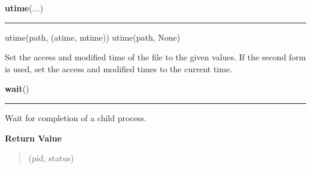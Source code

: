     \label{os:utime}

    \vspace{0.5ex}

\hspace{.8\funcindent}\begin{boxedminipage}{\funcwidth}

    \raggedright \textbf{utime}(\textit{...})

    \vspace{-1.5ex}

    \rule{\textwidth}{0.5\fboxrule}
\setlength{\parskip}{2ex}
    utime(path, (atime, mtime)) utime(path, None)

    Set the access and modified time of the file to the given values.  If 
    the second form is used, set the access and modified times to the 
    current time.

\setlength{\parskip}{1ex}
    \end{boxedminipage}

    \label{os:wait}

    \vspace{0.5ex}

\hspace{.8\funcindent}\begin{boxedminipage}{\funcwidth}

    \raggedright \textbf{wait}()

    \vspace{-1.5ex}

    \rule{\textwidth}{0.5\fboxrule}
\setlength{\parskip}{2ex}
    Wait for completion of a child process.

\setlength{\parskip}{1ex}
      \textbf{Return Value}
    \vspace{-1ex}

      \begin{quote}
      (pid, status)

      \end{quote}

    \end{boxedminipage}

    \label{os:wait3}

    \vspace{0.5ex}

